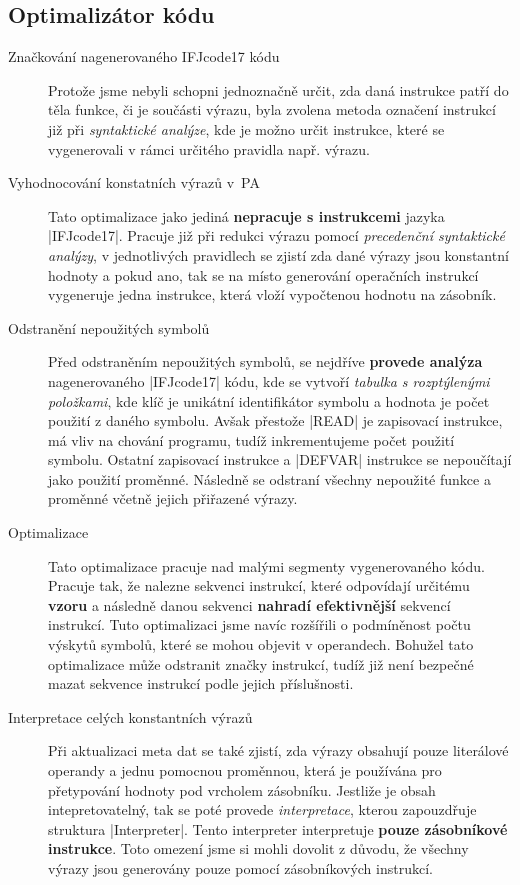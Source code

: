 \subsection{Optimalizátor kódu}
\begin{description}
    \item[Značkování nagenerovaného IFJcode17 kódu] Protože jsme nebyli schopni jednoznačně určit, zda daná instrukce patří do těla funkce, či je součásti výrazu, byla zvolena metoda označení instrukcí již při \emph{syntaktické analýze}, kde je možno určit instrukce, které se vygenerovali v rámci určitého pravidla např. výrazu.
    
    \item[Vyhodnocování konstatních výrazů v~PA]\label{subsec:optimization-cee} Tato optimalizace jako jediná \textbf{nepracuje s instrukcemi} jazyka \ic|IFJcode17|. Pracuje již při redukci výrazu pomocí \emph{precedenční syntaktické analýzy}, v jednotlivých pravidlech se zjistí zda dané výrazy jsou konstantní hodnoty a pokud ano, tak se na místo generování operačních instrukcí vygeneruje jedna instrukce, která vloží vypočtenou hodnotu na zásobník.
    
    \item[Odstranění nepoužitých symbolů] Před odstraněním nepoužitých symbolů, se nejdříve \textbf{provede analýza} nagenerovaného \ic|IFJcode17| kódu, kde se vytvoří \emph{tabulka s rozptýlenými položkami}, kde klíč je unikátní identifikátor symbolu a hodnota je počet použití z daného symbolu. Avšak přestože \ic|READ| je zapisovací instrukce, má vliv na chování programu, tudíž inkrementujeme počet použití symbolu. Ostatní zapisovací instrukce a \ic|DEFVAR| instrukce se nepoučítají jako použití proměnné. Následně se odstraní všechny nepoužité funkce a proměnné včetně jejich přiřazené výrazy.
    
    \item[Optimalizace ] Tato optimalizace pracuje nad malými segmenty vygenerovaného kódu. Pracuje tak, že nalezne sekvenci instrukcí, které odpovídají určitému \textbf{vzoru} a následně danou sekvenci \textbf{nahradí efektivnější} sekvencí instrukcí. Tuto optimalizaci jsme navíc rozšířili o podmíněnost počtu výskytů symbolů, které se mohou objevit v operandech. Bohužel tato optimalizace může odstranit značky instrukcí, tudíž již není bezpečné mazat sekvence instrukcí podle jejich příslušnosti.
    
    \item[Interpretace celých konstantních výrazů] Při aktualizaci meta dat se také zjistí, zda výrazy obsahují pouze literálové operandy a jednu pomocnou proměnnou, která je používána pro přetypování hodnoty pod vrcholem zásobníku. Jestliže je obsah intepretovatelný, tak se poté provede \emph{interpretace}, kterou zapouzdřuje struktura \ic|Interpreter|. Tento interpreter interpretuje \textbf{pouze zásobníkové instrukce}. Toto omezení jsme si mohli dovolit z důvodu, že všechny výrazy jsou generovány pouze pomocí zásobníkových instrukcí.
    

\end{description}
